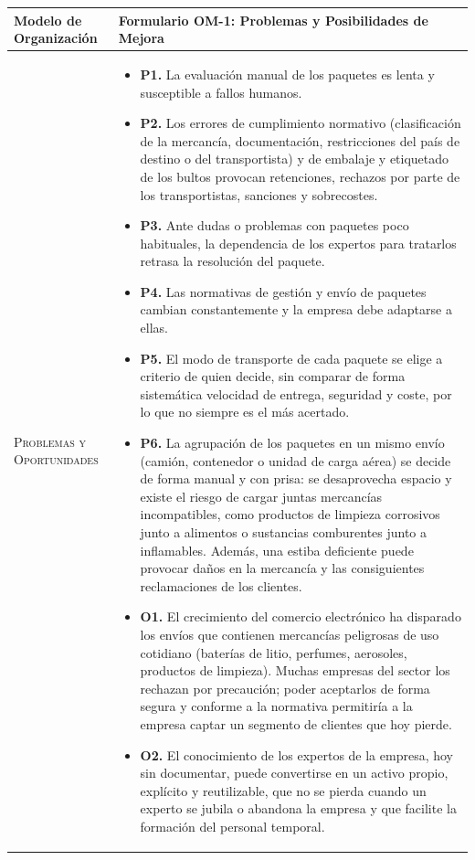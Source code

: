 \documentclass[12pt,a4paper,twoside,spanish]{article}      %
\begin{document}
{\scriptsize
\begin{longtable}{|p{2.8cm}|p{12.6cm}|} \hline
\textbf{Modelo de Organización} & \textbf{Formulario OM-1: Problemas y Posibilidades de Mejora} \\ \hline\hline
\endhead

\textsc{Problemas y Oportunidades} &
\begin{itemize}
    \item \textbf{P1.} La evaluación manual de los paquetes es lenta y susceptible a fallos humanos.
    \item \textbf{P2.} Los errores de cumplimiento normativo (clasificación de la mercancía, documentación, restricciones del país de destino o del transportista) y de embalaje y etiquetado de los bultos provocan retenciones, rechazos por parte de los transportistas, sanciones y sobrecostes.
    \item \textbf{P3.} Ante dudas o problemas con paquetes poco habituales, la dependencia de los expertos para tratarlos retrasa la resolución del paquete.
    \item \textbf{P4.} Las normativas de gestión y envío de paquetes cambian constantemente y la empresa debe adaptarse a ellas.
    \item \textbf{P5.} El modo de transporte de cada paquete se elige a criterio de quien decide, sin comparar de forma sistemática velocidad de entrega, seguridad y coste, por lo que no siempre es el más acertado.
    \item \textbf{P6.} La agrupación de los paquetes en un mismo envío (camión, contenedor o unidad de carga aérea) se decide de forma manual y con prisa: se desaprovecha espacio y existe el riesgo de cargar juntas mercancías incompatibles, como productos de limpieza corrosivos junto a alimentos o sustancias comburentes junto a inflamables. Además, una estiba deficiente puede provocar daños en la mercancía y las consiguientes reclamaciones de los clientes.
    \item \textbf{O1.} El crecimiento del comercio electrónico ha disparado los envíos que contienen mercancías peligrosas de uso cotidiano (baterías de litio, perfumes, aerosoles, productos de limpieza). Muchas empresas del sector los rechazan por precaución; poder aceptarlos de forma segura y conforme a la normativa permitiría a la empresa captar un segmento de clientes que hoy pierde.
    \item \textbf{O2.} El conocimiento de los expertos de la empresa, hoy sin documentar, puede convertirse en un activo propio, explícito y reutilizable, que no se pierda cuando un experto se jubila o abandona la empresa y que facilite la formación del personal temporal.
\end{itemize} \\ \hline


\end{longtable}}
\end{document}

